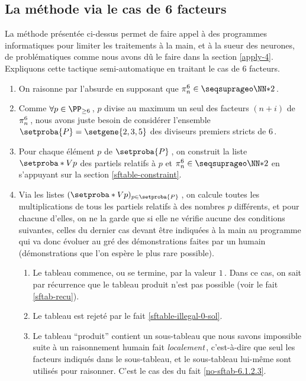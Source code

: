 \subsection{La méthode via le cas de 6 facteurs} \label{apply-6}

\leavevmode
\smallskip

La méthode présentée ci-dessus permet de faire appel à des programmes informatiques pour limiter les traitements à la main, et à la sueur des neurones, de \sftab[x] problématiques comme nous avons dû le faire dans la section \ref{apply-4}.
Expliquons cette tactique semi-automatique en traitant le cas de $6$ facteurs.

\begin{enumerate}
	\item On raisonne par l'absurde en supposant que $\consprod<6> \in \NNssquare$\,.


	\item Comme $\forall p \in \PP_{\geq 6}$\,, $p$ divise au maximum un seul des facteurs $(n + i)$ de $\consprod<6>$\,,
	nous avons juste besoin de considérer l'ensemble $\setproba{P} = \setgene{2, 3, 5}$ des diviseurs premiers stricts de $6$\,.


	\item Pour chaque élément $p$ de $\setproba{P}$\,, on construit la liste $\setproba*{V}{p}$ des \sftab[x] partiels relatifs à $p$ et $\consprod<6> \in \NNssquare$ en s'appuyant sur la section \ref{sftable-constraint}.


	\item Via les listes $( \setproba*{V}{p} )_{p \in \setproba{P}}$\,, on calcule toutes les multiplications de tous les \sftab[x] partiels relatifs à des nombres $p$ différents, et pour chacune d'elles, on ne la garde que si elle ne vérifie aucune des conditions suivantes, celles du dernier cas devant être indiquées à la main au programme qui va donc évoluer au gré des démonstrations faites par un humain (démonstrations que l'on espère le plus rare possible).
	\begin{enumerate}
		\item Le tableau commence, ou se termine, par la valeur $1$\,. Dans ce cas, on sait par récurrence que le tableau produit n'est pas possible (voir le fait \ref{sftab-recu}).

		\item Le tableau est rejeté par le fait \ref{sftable-illegal-0-sol}.

		\item Le tableau \enquote{produit} contient un sous-tableau que nous savons impossible suite à un raisonnement humain fait \emph{localement}\,, c'est-à-dire que seul les facteurs indiqués dans le sous-tableau, et le sous-tableau lui-même sont utilisés pour raisonner.
		C'est le cas des \sftab[x] du fait \ref{no-sftab-6.1.2.3}.
	\end{enumerate}
\end{enumerate}


